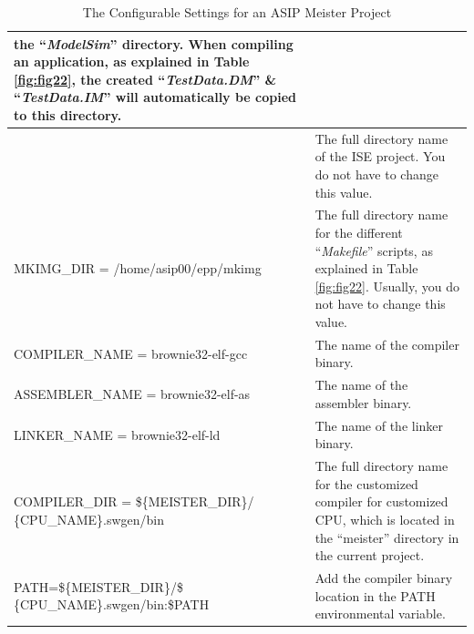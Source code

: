 \begin{table}[!htb]
\begin{tabular}{|p{6cm}|p{11cm}|}
		the ``\emph{ModelSim}'' directory. When compiling an application, as
		explained in Table \ref{fig:fig22}, the created
		``\emph{TestData.DM}'' \& ``\emph{TestData.IM}'' will automatically be
		copied to this directory.
		\\ \hline
		\vtop{\hbox{\strut ISE\_DIR =
				\$\{PROJECT\_}\hbox{\strut DIR\}/\$\{ISE\_NAME \}}} & The full directory
		name of the ISE project. You do not have to change this
		value.
		\\ \hline
		MKIMG\_DIR = /home/asip00/epp/mkimg & The full directory name for the
		different ``\emph{Makefile}'' scripts, as explained in
		Table \ref{fig:fig22}. Usually, you do not have to
		change this value.
		\\ \hline
		COMPILER\_NAME = brownie32-elf-gcc & The name of the compiler
		binary.
		\\ \hline
		ASSEMBLER\_NAME = brownie32-elf-as & The name of the assembler
		binary.
		\\ \hline
		LINKER\_NAME = brownie32-elf-ld & The name of the linker
		binary.
		\\ \hline
		COMPILER\_DIR = \$\{MEISTER\_DIR\}/ \{CPU\_NAME\}.swgen/bin & The full
		directory name for the customized compiler for customized CPU, which is
		located in the ``meister'' directory in the current
		project.
		\\ \hline
		PATH=\$\{MEISTER\_DIR\}/\$ \{CPU\_NAME\}.swgen/bin:\$PATH & Add the
		compiler binary location in the PATH environmental
		variable.
		\\ \hline
	\end{tabular}
	\caption{The Configurable Settings for an ASIP Meister Project}
	\label{fig:fig25}
\end{table}
